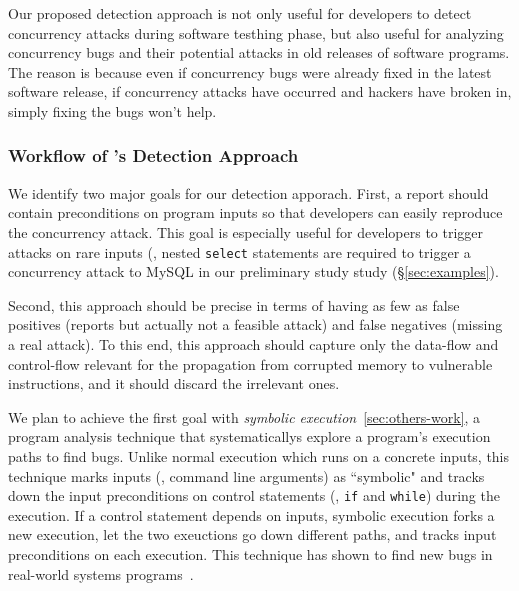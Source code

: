 Our proposed detection approach is not only useful for developers to detect 
concurrency attacks during software testhing phase, but also useful for 
analyzing concurrency bugs and their potential attacks in old releases of 
software programs. The reason is because even if concurrency bugs were already 
fixed in the latest software release, if concurrency attacks have occurred and 
hackers have broken in, simply fixing the bugs won't help.


\vspace{-.15in}\subsubsection{Workflow of \xxx's Detection Approach}
\label{sec:detect-arch}\vspace{-.075in}

We identify two major goals for our detection apporach. First, a report should 
contain preconditions on program inputs so that developers can easily reproduce 
the concurrency attack. This goal is especially useful for developers to 
trigger attacks on rare inputs (\eg, nested \texttt{select} statements are 
required to trigger a concurrency attack to MySQL in our preliminary 
study study (\S\ref{sec:examples}).

Second, this approach should be precise in terms of having as few as false 
positives (reports but actually not a feasible attack) and false negatives 
(missing a real attack). To this end, this approach should capture only the 
data-flow and control-flow relevant for the propagation from corrupted memory 
to vulnerable instructions, and it should discard the irrelevant ones. 

We plan to achieve the first goal with \emph{symbolic 
execution}~\ref{sec:others-work}, a program analysis technique that 
systematicallys explore a program's execution paths to find bugs. Unlike normal 
execution which runs on a concrete inputs, this technique marks inputs (\eg, 
command line arguments) as ``symbolic" and tracks down the input preconditions 
on control statements (\eg, \texttt{if} and \texttt{while}) during the 
execution. If a control statement depends on inputs, symbolic execution forks a 
new execution, let the two exeuctions go down different paths, and tracks input 
preconditions on each execution. This technique has shown to find new bugs in 
real-world systems programs~\cite{klee:osdi08}.

